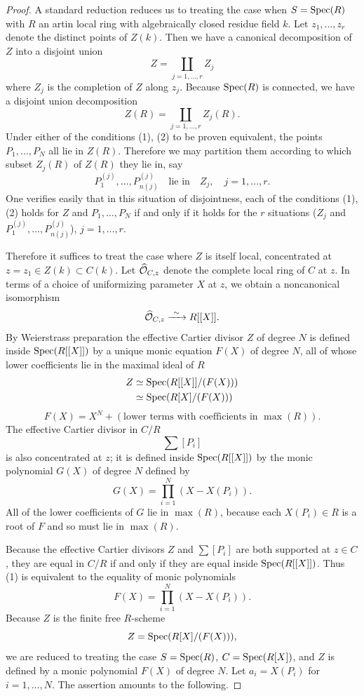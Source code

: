 \begin{proof}
A standard reduction reduces us to treating the case when $S = \operatorname{Spec}(R)$ with $R$ an artin local ring with algebraically closed residue field $k$. Let $z_1, \dots, z_r$ denote the distinct points of $Z(k)$. Then we have a canonical decomposition of $Z$ into a disjoint union
\[
Z = \coprod_{j=1,\dots,r} Z_j
\]
where $Z_j$ is the completion of $Z$ along $z_j$. Because $\operatorname{Spec}(R)$ is connected, we have a disjoint union decomposition
\[
Z(R) = \coprod_{j=1,\dots,r} Z_j(R).
\]
Under either of the conditions (1), (2) to be proven equivalent, the points $P_1, \dots, P_N$ all lie in $Z(R)$. Therefore we may partition them according to which subset $Z_j(R)$ of $Z(R)$ they lie in, say
\[
P_1^{(j)}, \dots, P_{n(j)}^{(j)} \quad \text{lie in} \quad Z_j, \quad j = 1, \dots, r.
\]
One verifies easily that in this situation of disjointness, each of the conditions (1), (2) holds for $Z$ and $P_1, \dots, P_N$ if and only if it holds for the $r$ situations ($Z_j$ and $P_1^{(j)}, \dots, P_{n(j)}^{(j)}$), $j = 1, \dots, r$.

Therefore it suffices to treat the case where $Z$ is itself local, concentrated at $z = z_1 \in Z(k) \subset C(k)$. Let $\widehat{\mathcal{O}}_{C,z}$ denote the complete local ring of $C$ at $z$. In terms of a choice of uniformizing parameter $X$ at $z$, we obtain a noncanonical isomorphism
\[
\widehat{\mathcal{O}}_{C,z} \xrightarrow{\ \sim\ } R[[X]].
\]
By Weierstrass preparation the effective Cartier divisor $Z$ of degree $N$ is defined inside $\operatorname{Spec}(R[[X]])$ by a unique monic equation $F(X)$ of degree $N$, all of whose lower coefficients lie in the maximal ideal of $R$
\begin{align*}
Z &\simeq \operatorname{Spec}(R[[X]]/(F(X))) \\
&\simeq \operatorname{Spec}(R[X]/(F(X)))
\end{align*}
\[
F(X) = X^N + (\text{lower terms with coefficients in } \max(R)).
\]
The effective Cartier divisor in $C/R$
\[
\sum [P_i]
\]
is also concentrated at $z$; it is defined inside $\operatorname{Spec}(R[[X]])$ by the monic polynomial $G(X)$ of degree $N$ defined by
\[
G(X) = \prod_{i=1}^N (X - X(P_i)).
\]
All of the lower coefficients of $G$ lie in $\max(R)$, because each $X(P_i) \in R$ is a root of $F$ and so must lie in $\max(R)$.

Because the effective Cartier divisors $Z$ and $\sum [P_i]$ are both supported at $z \in C$, they are equal in $C/R$ if and only if they are equal inside $\operatorname{Spec}(R[[X]])$. Thus (1) is equivalent to the equality of monic polynomials
\[
F(X) = \prod_{i=1}^N (X - X(P_i)).
\]
Because $Z$ is the finite free $R$-scheme
\[
Z = \operatorname{Spec}(R[X]/(F(X))),
\]
we are reduced to treating the case $S = \operatorname{Spec}(R)$, $C = \operatorname{Spec}(R[X])$, and $Z$ is defined by a monic polynomial $F(X)$ of degree $N$. Let $a_i = X(P_i)$ for $i = 1, \dots, N$. The assertion amounts to the following.
\end{proof}

